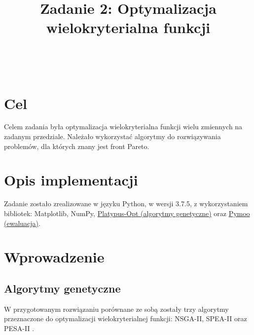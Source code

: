 \documentclass{classrep}
\author{%
  \\
  \studentinfo[234067@edu.p.lodz.pl]{Bartosz Jurczewski}{234067}\\
  \studentinfo[234106@edu.p.lodz.pl]{Karol Podlewski}{234106}%
}
\title{Zadanie 2: Optymalizacja wielokryterialna funkcji}
\begin{document}
\maketitle
\thispagestyle{fancyplain}

\clearpage

\section{Cel}

Celem zadania była optymalizacja wielokryterialna funkcji wielu zmiennych na zadanym przedziale. Należało wykorzystać algorytmy do rozwiązywania problemów, dla których znany jest front Pareto.


\section{Opis implementacji}

Zadanie zostało zrealizowane w języku Python, w wersji 3.7.5, z wykorzystaniem bibliotek: Matplotlib, NumPy, \href{https://github.com/Project-Platypus/Platypus}{Platypus-Opt (algorytmy genetyczne)}  oraz \href{https://pymoo.org}{Pymoo (ewaluacja)}.


\section{Wprowadzenie}

\subsection{Algorytmy genetyczne}
W przygotowanym rozwiązaniu porównane ze sobą zostały trzy algorytmy przeznaczone do optymalizacji wielokryterialnej funkcji: NSGA-II, SPEA-II oraz PESA-II . 
\end{document}
